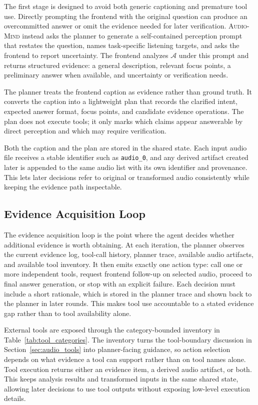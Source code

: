 \documentclass[11pt]{article}
\newcommand{\ours}{\textsc{Audio-Mind}}
\begin{document}
The first stage is designed to avoid both generic captioning and premature tool use. Directly prompting the frontend with the original question can produce an overcommitted answer or omit the evidence needed for later verification. \ours{} instead asks the planner to generate a self-contained perception prompt that restates the question, names task-specific listening targets, and asks the frontend to report uncertainty. The frontend analyzes $\mathcal{A}$ under this prompt and returns structured evidence: a general description, relevant focus points, a preliminary answer when available, and uncertainty or verification needs.

The planner treats the frontend caption as evidence rather than ground truth. It converts the caption into a lightweight plan that records the clarified intent, expected answer format, focus points, and candidate evidence operations. The plan does not execute tools; it only marks which claims appear answerable by direct perception and which may require verification.

Both the caption and the plan are stored in the shared state. Each input audio file receives a stable identifier such as \texttt{audio\_0}, and any derived artifact created later is appended to the same audio list with its own identifier and provenance. This lets later decisions refer to original or transformed audio consistently while keeping the evidence path inspectable.

\subsection{Evidence Acquisition Loop}
\label{sec:evidence_loop}

The evidence acquisition loop is the point where the agent decides whether additional evidence is worth obtaining. At each iteration, the planner observes the current evidence log, tool-call history, planner trace, available audio artifacts, and available tool inventory. It then emits exactly one action type: call one or more independent tools, request frontend follow-up on selected audio, proceed to final answer generation, or stop with an explicit failure. Each decision must include a short rationale, which is stored in the planner trace and shown back to the planner in later rounds. This makes tool use accountable to a stated evidence gap rather than to tool availability alone.

External tools are exposed through the category-bounded inventory in Table~\ref{tab:tool_categories}. The inventory turns the tool-boundary discussion in Section~\ref{sec:audio_tools} into planner-facing guidance, so action selection depends on what evidence a tool can support rather than on tool names alone. Tool execution returns either an evidence item, a derived audio artifact, or both. This keeps analysis results and transformed inputs in the same shared state, allowing later decisions to use tool outputs without exposing low-level execution details.
\end{document}
